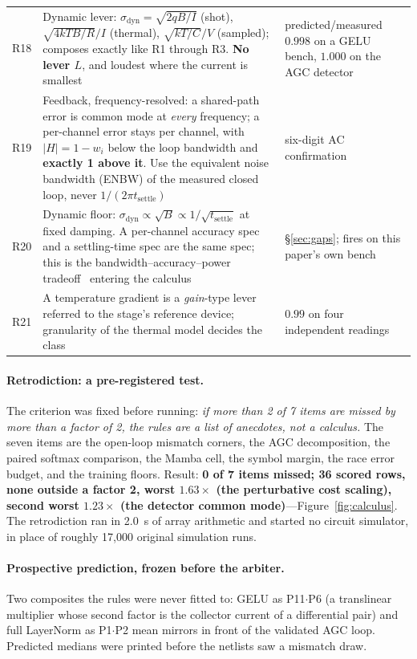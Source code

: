 \documentclass[11pt]{article}
\begin{document}
\begin{table}[t]
\begin{tabular}{p{0.7cm}p{9.6cm}p{4.2cm}}
R18 & Dynamic lever: $\sigma_{\mathrm{dyn}} = \sqrt{2qB/I}$ (shot), $\sqrt{4kTB/R}/I$ (thermal), $\sqrt{kT/C}/V$ (sampled); composes exactly like R1 through R3. \textbf{No lever $L$}, and loudest where the current is smallest & predicted/measured $0.998$ on a GELU bench, $1.000$ on the AGC detector \\
R19 & Feedback, frequency-resolved: a shared-path error is common mode at \textit{every} frequency; a per-channel error stays per channel, with $|H| = 1-w_i$ below the loop bandwidth and \textbf{exactly 1 above it}. Use the equivalent noise bandwidth (ENBW) of the measured closed loop, never $1/(2\pi t_{\mathrm{settle}})$ & six-digit AC confirmation \\
R20 & Dynamic floor: $\sigma_{\mathrm{dyn}} \propto \sqrt B \propto 1/\sqrt{t_{\mathrm{settle}}}$ at fixed damping. A per-channel accuracy spec and a settling-time spec are the same spec; this is the bandwidth--accuracy--power tradeoff~\cite{kinget2005} entering the calculus & \S\ref{sec:gaps}; fires on this paper's own bench \\
R21 & A temperature gradient is a \textit{gain}-type lever referred to the stage's reference device; granularity of the thermal model decides the class & $0.99$ on four independent readings \\
\bottomrule
\end{tabular}
\end{table}

\paragraph{Retrodiction: a pre-registered test.} The criterion was fixed before running: \textit{if more than 2 of 7 items are missed by more than a factor of 2, the rules are a list of anecdotes, not a calculus.} The seven items are the open-loop mismatch corners, the AGC decomposition, the paired softmax comparison, the Mamba cell, the symbol margin, the race error budget, and the training floors. Result: \textbf{0 of 7 items missed; 36 scored rows, none outside a factor 2, worst $1.63\times$ (the perturbative cost scaling), second worst $1.23\times$ (the detector common mode)}---Figure~\ref{fig:calculus}. The retrodiction ran in 2.0~s of array arithmetic and started no circuit simulator, in place of roughly 17{,}000 original simulation runs.

\paragraph{Prospective prediction, frozen before the arbiter.} Two composites the rules were never fitted to: GELU as P11$\cdot$P6 (a translinear multiplier whose second factor is the collector current of a differential pair) and full LayerNorm as P1$\cdot$P2 mean mirrors in front of the validated AGC loop. Predicted medians were printed before the netlists saw a mismatch draw.
\end{document}
